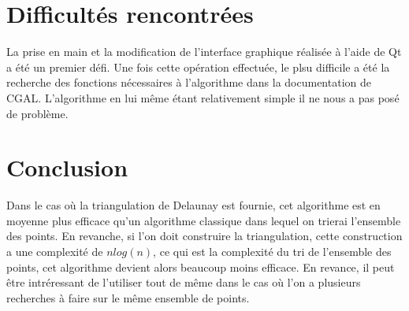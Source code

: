 \documentclass[a4paper, 11pt]{report}
\begin{document}
  \section*{Difficultés rencontrées}
  La prise en main et la modification de l'interface graphique réalisée à l'aide de Qt a été un premier défi. Une
  fois cette opération effectuée, le plsu difficile a été la recherche des fonctions nécessaires à l'algorithme 
  dans la documentation de CGAL. L'algorithme en lui même étant relativement simple il ne nous a pas posé 
  de problème.

  \section*{Conclusion} 
  Dans le cas où la triangulation de Delaunay est fournie, cet algorithme est en moyenne plus efficace qu'un 
  algorithme classique dans lequel on trierai l'ensemble des points. En revanche, si l'on doit construire la 
  triangulation, cette construction a une complexité de $n log(n)$, ce qui est la complexité du tri de 
  l'ensemble des points, cet algorithme devient alors beaucoup moins efficace. En revance, il peut être 
  intréressant de l'utiliser tout de même dans le cas où l'on a plusieurs recherches à faire sur le même 
  ensemble de points.
\end{document}
